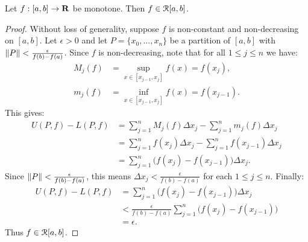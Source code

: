 \documentclass[11pt,twoside,openany]{memoir}
\begin{document}
    \begin{theorem}
        Let $f:[a,b] \rightarrow \mathbf{R}$ be monotone. Then $f \in \mathcal{R}[a,b]$.
    \end{theorem}
        \begin{proof}
            Without loss of generality, suppose $f$ is non-constant and non-decreasing on $[a,b]$. Let $\epsilon > 0$ and let $P = \{x_0,...,x_n\}$ be a partition of $[a,b]$ with $\left\lVert P \right\rVert < \frac{\epsilon}{f(b) - f(a)}$. Since $f$ is non-decreasing, note that for all $1 \leq j \leq n$ we have:
                \begin{equation*}
                \begin{split}
                    M_j(f) & = \sup_{x \in [x_{j-1},x_j]}f(x) = f(x_j), \\
                    m_j(f) & = \inf_{x \in [x_{j-1},x_j]}f(x) = f(x_{j-1}).
                \end{split}
                \end{equation*}
            This gives:
                \begin{equation*}
                \begin{split}
                    U(P,f) - L(P,f)
                    & = \sum_{j = 1}^n M_j(f)\Delta x_j - \sum_{j = 1}^n m_j(f)\Delta x_j \\
                    & = \sum_{j = 1}^n f(x_j)\Delta x_j - \sum_{j = 1}^n f(x_{j-1})\Delta x_j \\
                    & = \sum_{j = 1}^n \bigl(f(x_j) - f(x_{j-1})\bigr)\Delta x_j.
                \end{split}
                \end{equation*}
            Since $\left\lVert P \right\rVert < \frac{\epsilon}{f(b) - f(a)}$, this means $\Delta x_j < \frac{\epsilon}{f(b)-f(a)}$ for each $1 \leq j \leq n$. Finally:
                \begin{equation*}
                \begin{split}
                    U(P,f) - L(P,f)
                    & = \sum_{j = 1}^n \bigl(f(x_j) - f(x_{j-1})\bigr)\Delta x_j \\
                    & < \frac{\epsilon}{f(b) - f(a)}\sum_{j = 1}^n \bigl(f(x_j) - f(x_{j-1})\bigr) \\
                    & = \epsilon.
                \end{split}
                \end{equation*}
            Thus $f \in \mathcal{R}[a,b]$.
        \end{proof}
\end{document}
